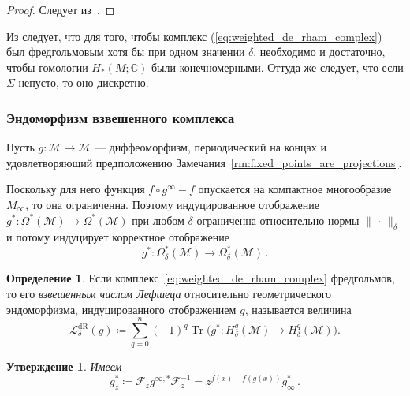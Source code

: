 \documentclass[a4paper, 12pt]{article}
\newtheorem{proposition}[theorem]{Утверждение}
\theoremstyle{definition}
\newtheorem{definition}[theorem]{Определение}
\begin{document}
\begin{proof}
    Следует из~\cite[Proof of Theorem 1.1]{mrowka2015index}.
\end{proof}

Из \cite[Propositions 2.2 \& 2.4]{mrowka2015index} следует, что для того, чтобы комплекс (\ref{eq:weighted_de_rham_complex}) был фредгольмовым хотя бы при одном значении \({ \delta }\), необходимо и достаточно, чтобы гомологии \({ H_*(M; \mathbb C) }\) были конечномерными. Оттуда же \cite[Propoistion 2.2]{mrowka2015index} следует, что если \({ \Sigma }\) непусто, то оно дискретно.

\subsubsection{Эндоморфизм взвешенного комплекса}

Пусть \({ g : \mathcal M \to \mathcal M }\) --- диффеоморфизм, периодический на концах и удовлетворяющий предположению Замечания~\ref{rm:fixed_points_are_projections}.

Поскольку для него функция \({ f \circ g^{\infty} - f }\) опускается на компактное многообразие \({ M_{\infty} }\), то она ограниченна. Поэтому индуцированное отображение \({ g^{*} : \Omega^{*}(\mathcal M) \to \Omega^{*}(\mathcal M) }\) при любом \({ \delta }\) ограниченна относительно нормы \({ \lVert \,\cdot\, \rVert_{\delta} }\) и потому индуцирует корректное отображение \[
    g^{*} : \Omega^{*}_{\delta}(\mathcal M) \to \Omega^{*}_{\delta}(\mathcal M)\,.
\]

\begin{definition}
    Если комплекс~\eqref{eq:weighted_de_rham_complex} фредгольмов, то его \emph{взвешенным числом Лефшеца} относительно геометрического эндоморфизма, индуцированного отображением $g$, называется величина
    \[
        \mathcal L^{\operatorname{dR}}_{\delta}(g)
        \coloneqq
        \sum_{q=0}^{n} (-1)^q
        \operatorname{Tr}\bigl(
            g^* \colon H^q_{\delta}(\mathcal M) \to H^q_{\delta}(\mathcal M)
        \bigr).
    \]
\end{definition}

\begin{proposition}
    Имеем \[
        g^{*}_{z} \coloneqq \mathcal F_{z} g^{\infty,*} \mathcal F_{z}^{-1} = z^{f(x) - f(g(x))} g_{\infty}^{*}\,.
    \]
\end{proposition}
\end{document}

